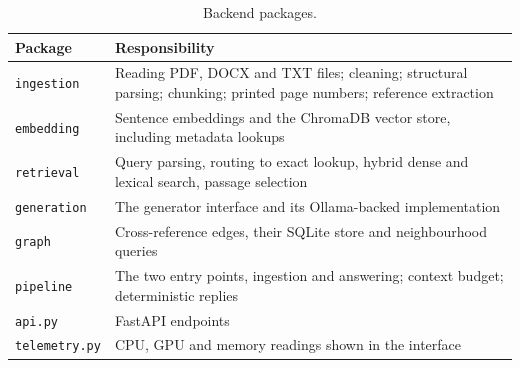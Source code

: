 \begin{table}[ht]
\centering
\small
\begin{tabularx}{\textwidth}{@{}lX@{}}
\toprule
Package & Responsibility \\
\midrule
\texttt{ingestion}  & Reading PDF, DOCX and TXT files; cleaning; structural
                      parsing; chunking; printed page numbers; reference
                      extraction \\
\texttt{embedding}  & Sentence embeddings and the ChromaDB vector store,
                      including metadata lookups \\
\texttt{retrieval}  & Query parsing, routing to exact lookup, hybrid dense and
                      lexical search, passage selection \\
\texttt{generation} & The generator interface and its Ollama-backed
                      implementation \\
\texttt{graph}      & Cross-reference edges, their SQLite store and
                      neighbourhood queries \\
\texttt{pipeline}   & The two entry points, ingestion and answering; context
                      budget; deterministic replies \\
\texttt{api.py}     & FastAPI endpoints \\
\texttt{telemetry.py} & CPU, GPU and memory readings shown in the interface \\
\bottomrule
\end{tabularx}
\caption{Backend packages.}
\label{tab:packages}
\end{table}


